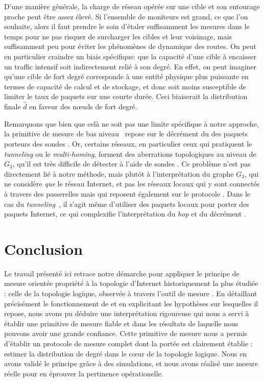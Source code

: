 D'une manière générale, la charge de réseau opérée sur une cible et son
entourage proche peut être assez élevé. Si l'ensemble de moniteurs est grand, ce
que l'on souhaite, alors il faut prendre le soin d'étaler suffisamment les
mesures dans le temps pour ne pas risquer de surcharger les cibles et leur
voisinage, mais suffisamment peu pour éviter les phénomènes de dynamique des
routes. On peut en particulier craindre un biais spécifique: que la capacité
d'une cible à encaisser un traffic \icmp intensif soit indirectement relié à son
degré. En effet, on peut imaginer qu'une cible de fort degré corresponde à une
entité physique plus puissante en termes de capacité de calcul et de stockage,
et donc soit moins susceptible de limiter le taux de paquets \icmp sur une
courte durée. Ceci biaiserait la distribution finale $\hat{d}$ en faveur des
n\oe{}uds de fort degré.

Remarquons que bien que celà ne soit pas une limite spécifique à notre approche,
la primitive de mesure de bas niveau~ repose sur
le décrément du \ttl des paquets \ip porteurs des sondes \icmp. Or, certains
réseaux, en particulier ceux qui pratiquent le {\em tunneling} ou le {\em
multi-homing}, forment des aberrations topologiques au niveau de $G_3$, qu'il
est très difficile de détecter à l'aide de sondes \icmp.
Ce problème n'est pas directement lié à notre méthode, mais plutôt à
l'interprétation du graphe $G_3$, qui ne considère {\em que} le réseau Internet,
et pas les réseaux locaux qui y sont connectés à travers des passerelles mais
qui reposent également sur le protocole \ip. Dans le cas du {\em
tunneling}~\cite{rfc1853,rfc2003}, il s'agit même d'utiliser des paquets \ip
locaux pour porter des paquets \ip Internet, ce qui complexifie l'interprétation
du {\em hop} et du décrément \ttl.

\section{Conclusion}
\label{sec:traceroute-conclusion}

Le travail présenté ici retrace notre démarche pour appliquer le principe de
mesure orientée propriété à la topologie d'Internet historiquement la plus
étudiée : celle de la topologie logique, observée à travers l'outil de mesure
\traceroute. En détaillant précisément le fonctionnement de \traceroute et en
explicitant les hypothèses sur lesquelles il repose, nous avons pu déduire une
interprétation rigoureuse qui nous a servi à établir une primitive de mesure
fiable et dans les résultats de laquelle nous pouvons avoir une grande
confiance. Cette primitive de mesure nous a permis d'établir un protocole de
mesure complet dont la portée est clairement établie : estimer la distribution
de degré dans le c\oe{}ur de la topologie logique. Nous en avons validé le
principe grâce à des simulations, et nous avons réalisé une mesure réelle pour
en éprouver la pertinence opérationelle.

